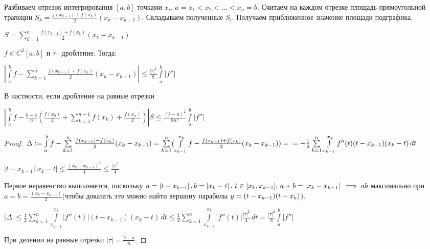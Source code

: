 \begin{definition}

Разбиваем отрезок интегрирования $[a, b]$ точками $x_i$. $a = x_1 < x_2 < ... < x_n = b$. Считаем на каждом отрезке площадь прямоугольной трапеции $S_k = \frac{f(x_{k-1}) + f(x_k)}{2} (x_k - x_{k-1})$. Складываем полученные $S_i$. Получаем приближенное значение площади подграфика.

$S = \sum\limits_{k=1}^{n} \frac{f(x_{k-1}) + f(x_k)}{2} (x_k - x_{k-1})$

\end{definition}

\begin{theorem}\slashns
	
	$f \in C^2[a,b]$ и $\tau$-- дробление. Тогда:
	
	$\left|\int\limits_a^b f - \sum\limits_{k=1}^{n} \frac{f(x_{k-1}) + f(x_k)}{2} (x_k - x_{k-1})\right| \le \frac{\left|\tau\right|^2}{8} \int\limits_a^b \left| f''\right|$
	
	В частности, если дробление на равные отрезки
	
	$\left|\int\limits_a^b f - \frac{b-a}{n}(\frac{f(x_0)}{2} + \sum\limits_{k=1}^{n-1}f(x_k) + \frac{f(x_n)}{2})\right| S\le \frac{(b-a)^2}{8n^2} \int\limits_a^b \left|f''\right|$
\end{theorem}


\begin{proof}\slashns
	
	$\Delta:= \int\limits_a^b f - \sum\limits_{k=1}^{n} \frac{f(x_{k-1}) + f(x_k)}{2}(x_k - x_{k-1}) = \sum\limits_{k=1}^{n}(\int\limits_{x_{k-1}}^{x_k} f - \frac{f(x_{k-1}) + f(x_k)}{2} (x_k - x_{k-1})) =\\= -\frac12 \sum\limits_{k=1}^n \int\limits_{x_{k-1}}^{x_k} f''(t)(t-x_{k-1})(x_k - t) \, dt $
	
	$\left|t-x_{k-1}\right|\left|x_{k}-t\right|\le \frac{(x_k - x_{k - 1})^2}{4}\le \frac{\left|\tau\right|^2}{4}$
	
	Первое неравенство выполняется, поскольку $a = \left|t-x_{k-1}\right|, b = \left|x_{k}-t\right|.\ t\in [x_k, x_{k-1}].\ a + b =  \left|x_k - x_{k - 1}\right|\\ \implies ab$ максимально при $a = b = \frac{(x_k - x_{k - 1})}{2}$(чтобы доказать это можно найти вершину параболы $\\y = (t-x_{k-1})(t-x_{k})$).
	
	$\left|\Delta\right| \le \frac12 \sum\limits_{k=1}^n \int\limits_{x_{k-1}}^{x_k} \left|f''(t)\right|(t - x_{k-1})(x_k - t) \, dt \le \frac12 \sum\limits_{k=1}^n \int\limits_{x_{k-1}}^{x_k} \left|f''(t)\right|\frac{\left|\tau\right|^2}{4} \, dt = \frac{\left|\tau\right|^2}{8} \int\limits_a^b \left|f''\right|$
		
	При делении на равные отрезки $\left|\tau\right| = \frac{b - a}{n}.$	
	
\end{proof}

